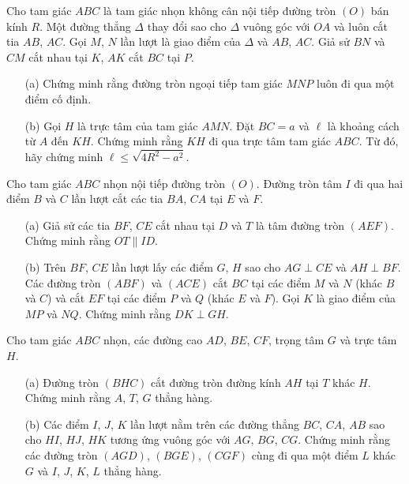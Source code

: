         \boom

        \begin{exercise}
            Cho tam giác \(ABC\) là tam giác nhọn không cân nội tiếp đường tròn \((O)\) bán kính \(R\). Một đường thẳng \(\Delta\) thay đổi sao cho \(\Delta\) vuông góc với \(OA\) và luôn cắt tia \(AB\), \(AC\). Gọi \(M\), \(N\) lần lượt là giao điểm của \(\Delta\) và \(AB\), \(AC\). Giả sử \(BN\) và \(CM\) cắt nhau tại \(K\), \(AK\) cắt \(BC\) tại \(P\).
            \begin{enumerate}
                \item[(a)] Chứng minh rằng đường tròn ngoại tiếp tam giác \(MNP\) luôn đi qua một điểm cố định.
                \item[(b)] Gọi \(H\) là trực tâm của tam giác \(AMN\). Đặt \(BC = a\) và \(\ell\) là khoảng cách từ \(A\) đến \(KH\). Chứng minh rằng \(KH\) đi qua trực tâm tam giác \(ABC\). Từ đó, hãy chứng minh \(\ell \leq \sqrt{4R^2 - a^2}\).
            \end{enumerate}
        \end{exercise}

        \boom

        \begin{exercise}
            Cho tam giác \(ABC\) nhọn nội tiếp đường tròn \((O)\). Đường tròn tâm \(I\) đi qua hai điểm \(B\) và \(C\) lần lượt cắt các tia \(BA\), \(CA\) tại \(E\) và \(F\).
            \begin{enumerate}
                \item[(a)] Giả sử các tia \(BF\), \(CE\) cắt nhau tại \(D\) và \(T\) là tâm đường tròn \((AEF)\). Chứng minh rằng \(OT \parallel ID\).
                \item[(b)] Trên \(BF\), \(CE\) lần lượt lấy các điểm \(G\), \(H\) sao cho \(AG \perp CE\) và \(AH \perp BF\). Các đường tròn \((ABF)\) và \((ACE)\) cắt \(BC\) tại các điểm \(M\) và \(N\) (khác \(B\) và \(C\)) và cắt \(EF\) tại các điểm \(P\) và \(Q\) (khác \(E\) và \(F\)). Gọi \(K\) là giao điểm của \(MP\) và \(NQ\). Chứng minh rằng \(DK \perp GH\).
            \end{enumerate}
        \end{exercise}

        \boom

        \begin{exercise}
            Cho tam giác \(ABC\) nhọn, các đường cao \(AD\), \(BE\), \(CF\), trọng tâm \(G\) và trực tâm \(H\).
            \begin{enumerate}
                \item[(a)] Đường tròn \((BHC)\) cắt đường tròn đường kính \(AH\) tại \(T\) khác \(H\). Chứng minh rằng \(A\), \(T\), \(G\) thẳng hàng.
                \item[(b)] Các điểm \(I\), \(J\), \(K\) lần lượt nằm trên các đường thẳng \(BC\), \(CA\), \(AB\) sao cho \(HI\), \(HJ\), \(HK\) tương ứng vuông góc với \(AG\), \(BG\), \(CG\). Chứng minh rằng các đường tròn \((AGD)\), \((BGE)\), \((CGF)\) cùng đi qua một điểm \(L\) khác \(G\) và \(I\), \(J\), \(K\), \(L\) thẳng hàng.
            \end{enumerate}
        \end{exercise}
        
